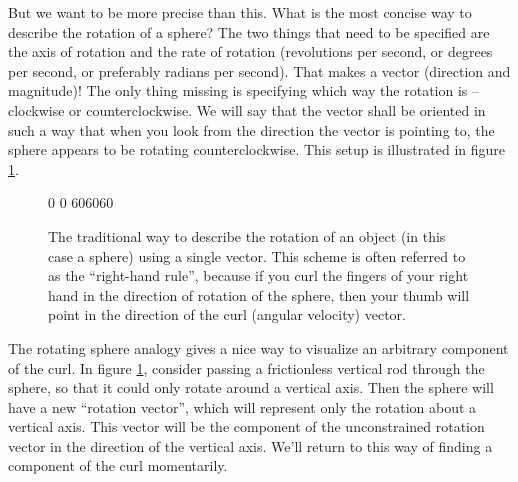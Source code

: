 \documentclass{myarticle}
\theoremstyle{nospace}
\newtheorem{old series theorem}{Theorem}
\newenvironment{series theorem}{\begin{mdframed}\begin{old series theorem}}{\end{old series theorem}\end{mdframed}}
\begin{document}
But we want to be more precise than this. What is the most concise way to describe the rotation of a sphere? The two things that need to be specified are the axis of rotation and the rate of rotation (revolutions per second, or degrees per second, or preferably radians per second). That makes a vector (direction and magnitude)! The only thing missing is specifying which way the rotation is -- clockwise or counterclockwise. We will say that the vector shall be oriented in such a way that when you look from the direction the vector is pointing to, the sphere appears to be rotating counterclockwise. This setup is illustrated in figure \ref{fig:curl sphere}.

\begin{figure}[htb!] \centering

\tdplotsetmaincoords
{0} %
{0} %
\tdplotsetrotatedcoords
{60}{60}{60}

\caption{The traditional way to describe the rotation of an object (in this case a sphere) using a single vector. This scheme is often referred to as the ``right-hand rule'', because if you curl the fingers of your right hand in the direction of rotation of the sphere, then your thumb will point in the direction of the curl (angular velocity) vector.}
\label{fig:curl sphere}
\end{figure}

The rotating sphere analogy gives a nice way to visualize an arbitrary component of the curl. In figure \ref{fig:curl sphere}, consider passing a frictionless vertical rod through the sphere, so that it could only rotate around a vertical axis. Then the sphere will have a new ``rotation vector'', which will represent only the rotation about a vertical axis. This vector will be the component of the unconstrained rotation vector in the direction of the vertical axis. We'll return to this way of finding a component of the curl momentarily.
\end{document}
